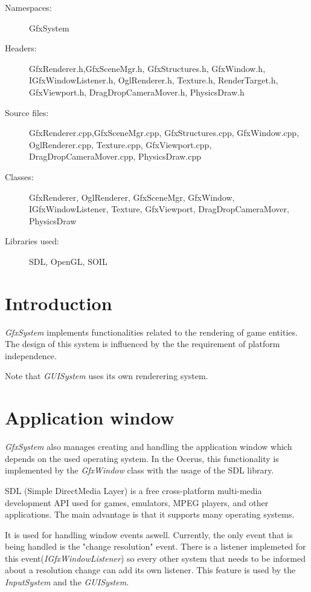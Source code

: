 \begin{description}
  \item[Namespaces:] GfxSystem
  \item[Headers:]GfxRenderer.h,GfxSceneMgr.h, GfxStructures.h, GfxWindow.h, IGfxWindowListener.h, OglRenderer.h, Texture.h, RenderTarget.h, GfxViewport.h, DragDropCameraMover.h, PhysicsDraw.h
  \item[Source files:] GfxRenderer.cpp,GfxSceneMgr.cpp, GfxStructures.cpp, GfxWindow.cpp, OglRenderer.cpp, Texture.cpp, GfxViewport.cpp, DragDropCameraMover.cpp, PhysicsDraw.cpp
  \item[Classes:] GfxRenderer, OglRenderer, GfxSceneMgr, GfxWindow, IGfxWindowListener, Texture, GfxViewport, DragDropCameraMover, PhysicsDraw
  \item[Libraries used:] SDL, OpenGL, SOIL
\end{description}

\section{Introduction}

 \emph{GfxSystem} implements functionalities related to the rendering of game entities. The design of this system is influenced by the the requirement of platform independence. 

Note that \emph{GUISystem} uses its own renderering system.

\section{Application window}
\emph{GfxSystem} also manages creating and handling the application window which depends on the used operating system. In the Ocerus, this functionality is implemented by the \emph{GfxWindow} class with the usage of the SDL library.

SDL (Simple DirectMedia Layer) is a free cross-platform multi-media development API used for games, emulators, MPEG players, and other applications. The main advantage is that it supports many operating systems.

It is used for handling window events aswell. Currently, the only event that is being handled is the "change resolution" event. There is a listener implemeted for this event(\emph{IGfxWindowListener}) so every other system that needs to be informed about a resolution change can add its own listener. This feature is used by the \emph{InputSystem} and the \emph{GUISystem}.

